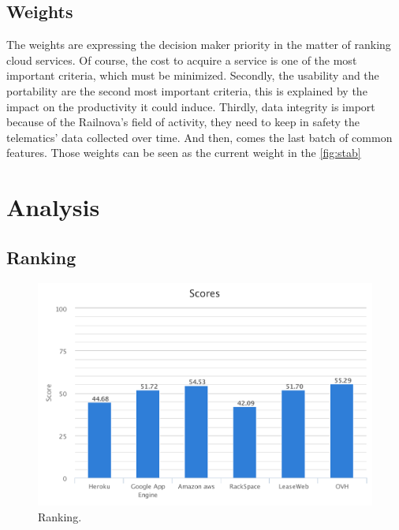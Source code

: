 \documentclass[a4paper,11pt]{article}
\begin{document}
\subsection{Weights}
The weights are expressing the decision maker priority in the matter of ranking cloud services. Of course, the cost to acquire a service is one of the most important criteria, which must be minimized. Secondly, the usability and the portability are the second most important criteria, this is explained by the impact on the productivity it could induce. Thirdly, data integrity is import because of the Railnova's field of activity, they need to keep in safety the telematics' data collected over time. And then, comes the last batch of common features. Those weights can be seen as the current weight in the \ref{fig:stab}

\section{Analysis}

\subsection{Ranking}

\begin{figure}[h]
  \center
  \includegraphics[width=\textwidth-5cm]{img/Result/ranking.pdf}
  \caption{Ranking.}
  \label{fig:ranking}
\end{figure}
\end{document}
